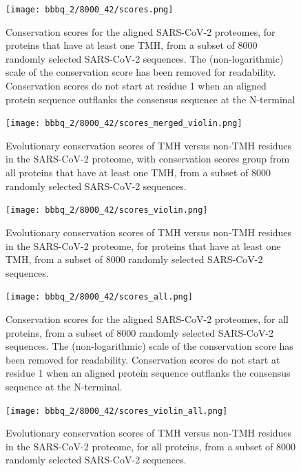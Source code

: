 \begin{figure}[!htbp]
  \texttt{[image: bbbq\_2/8000\_42/scores.png]}
  \caption{
    Conservation scores for the aligned SARS-CoV-2 proteomes,
    for proteins that have at least one TMH,
    from a subset of 8000 randomly selected SARS-CoV-2 sequences.
    The (non-logarithmic) scale of the conservation score has been removed
    for readability.
    Conservation scores do not start at residue 1 when
    an aligned protein sequence outflanks the consensus sequence 
    at the N-terminal
  }
  \label{fig:evolutionary_conservation_8k}
\end{figure}

\begin{figure}[!htbp]
  \texttt{[image: bbbq\_2/8000\_42/scores\_merged\_violin.png]}
  \caption{
    Evolutionary conservation scores of TMH versus non-TMH
    residues in the SARS-CoV-2 proteome,
    with conservation scores group from all proteins that have at least one TMH,
    from a subset of 8000 randomly selected SARS-CoV-2 sequences.
  }
  \label{fig:evolutionary_conservation_8k_merged}
\end{figure}

\begin{figure}[!htbp]
  \texttt{[image: bbbq\_2/8000\_42/scores\_violin.png]}
  \caption{
    Evolutionary conservation scores of TMH versus non-TMH
    residues in the SARS-CoV-2 proteome,
    for proteins that have at least one TMH,
    from a subset of 8000 randomly selected SARS-CoV-2 sequences.
  }
  \label{fig:evolutionary_conservation_8k_violin}
\end{figure}

\begin{figure}[!htbp]
  \texttt{[image: bbbq\_2/8000\_42/scores\_all.png]}
  \caption{
    Conservation scores for the aligned SARS-CoV-2 proteomes,
    for all proteins,
    from a subset of 8000 randomly selected SARS-CoV-2 sequences.
    The (non-logarithmic) scale of the conservation score has been removed
    for readability.
    Conservation scores do not start at residue 1 when
    an aligned protein sequence outflanks the consensus sequence 
    at the N-terminal.
  }
  \label{fig:evolutionary_conservation_8k_all}
\end{figure}

\begin{figure}[!htbp]
  \texttt{[image: bbbq\_2/8000\_42/scores\_violin\_all.png]}
  \caption{
    Evolutionary conservation scores of TMH versus non-TMH
    residues in the SARS-CoV-2 proteome,
    for all proteins,
    from a subset of 8000 randomly selected SARS-CoV-2 sequences.
  }
  \label{fig:evolutionary_conservation_8k_all_violin}
\end{figure}

